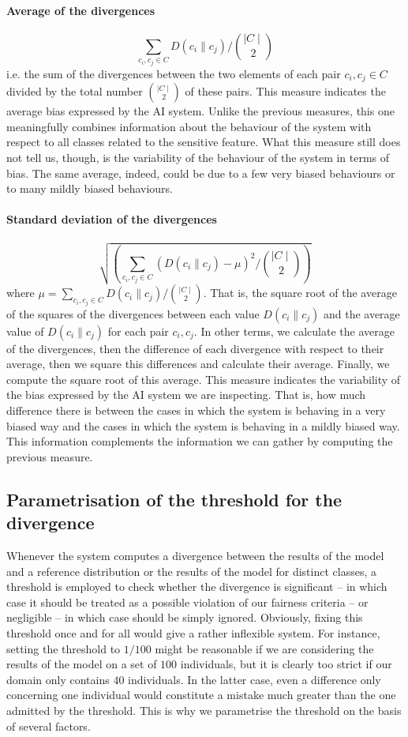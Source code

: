 \documentclass[
]{ceurart}
\begin{document}
\paragraph{Average of the divergences}
$$\sum_{c_i,c_j\in C} D(c_i\parallel c_j)/\binom{\mid C\mid}{2}$$
i.e. the sum of the divergences between the two elements of each pair $c_i,c_j\in C$ divided by the total number $\binom{\mid C\mid}{2}$ of these pairs. This measure indicates the average bias expressed by the AI system. Unlike the previous measures, this one meaningfully combines information about the behaviour of the system with respect to all classes related to the sensitive feature.  What this measure still does not tell us, though, is the variability of the behaviour of the system in terms of bias. The same average, indeed, could be due to a few very biased behaviours or to many mildly biased behaviours.


\paragraph{Standard deviation of the divergences}
\[\sqrt{ (\sum_{c_i,c_j\in C} (D(c_i\parallel c_j)-\mu)^2 / \binom{\mid C\mid}{2}  )}\] where  $\mu = \sum_{c_i,c_j\in C} D(c_i\parallel c_j)/\binom{\mid C\mid}{2}$. That is, the square root of the average of the squares of the divergences between each value $D(c_i\parallel c_j)$ and the average value of $D(c_i\parallel c_j)$ for each pair $c_i,c_j$. In other terms,  we calculate the average of the divergences, then the difference of each divergence with respect to their average, then we square this differences and calculate their average. Finally, we compute the square root of this average.
This measure indicates the variability of the bias expressed by the AI system we are inspecting. That is, how much difference there is between the cases in which the system is behaving in a very biased way and the cases in which the system is behaving in a mildly biased way. This information complements the information we can gather by computing the previous measure.

\subsection{Parametrisation of the threshold for the divergence}\label{threshold}

Whenever the system computes a divergence between the results of the model and a reference distribution or the results of the model for distinct classes, a threshold is employed to check whether the divergence is significant -- in which case it should be treated as a possible violation of our fairness criteria -- or negligible -- in which case should be simply ignored. Obviously, fixing this threshold once and for all would give a rather inflexible system. For instance, setting the threshold to $1/100$ might be reasonable if we are considering the results of the model on a set of $100$ individuals, but it is clearly too strict if our domain only contains $40$ individuals. In the latter case, even a difference only concerning one individual would constitute a mistake much greater than the one admitted by the threshold. This is why we parametrise the threshold on the basis of several factors. 
\end{document}
